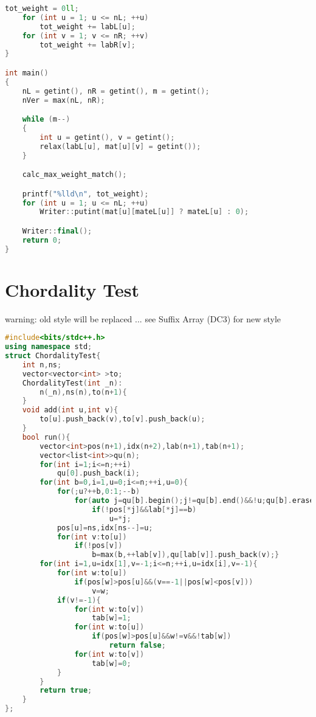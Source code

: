 \documentclass{book}
\begin{document}
\begin{lstlisting}[language=C++,title={Bipartite Graph Maximum Weighted Matching.hpp (4522 bytes, 259 lines)}]
	tot_weight = 0ll;
	for (int u = 1; u <= nL; ++u)
		tot_weight += labL[u];
	for (int v = 1; v <= nR; ++v)
		tot_weight += labR[v];
}

int main()
{
	nL = getint(), nR = getint(), m = getint();
	nVer = max(nL, nR);

	while (m--)
	{
		int u = getint(), v = getint();
		relax(labL[u], mat[u][v] = getint());
	}

	calc_max_weight_match();

	printf("%lld\n", tot_weight);
	for (int u = 1; u <= nL; ++u)
		Writer::putint(mat[u][mateL[u]] ? mateL[u] : 0);

	Writer::final();
	return 0;
}\end{lstlisting}
\section{Chordality Test}
warning: old style will be replaced ... see Suffix Array (DC3) for new style\begin{lstlisting}[language=C++,title={Chordality Test.hpp (1343 bytes, 42 lines)}]
#include<bits/stdc++.h>
using namespace std;
struct ChordalityTest{
    int n,ns;
    vector<vector<int> >to;
    ChordalityTest(int _n):
        n(_n),ns(n),to(n+1){
    }
    void add(int u,int v){
        to[u].push_back(v),to[v].push_back(u);
    }
    bool run(){
        vector<int>pos(n+1),idx(n+2),lab(n+1),tab(n+1);
        vector<list<int>>qu(n);
        for(int i=1;i<=n;++i)
            qu[0].push_back(i);
        for(int b=0,i=1,u=0;i<=n;++i,u=0){
            for(;u?++b,0:1;--b)
                for(auto j=qu[b].begin();j!=qu[b].end()&&!u;qu[b].erase(j++))
                    if(!pos[*j]&&lab[*j]==b)
                        u=*j;
            pos[u]=ns,idx[ns--]=u;
            for(int v:to[u])
                if(!pos[v])
                    b=max(b,++lab[v]),qu[lab[v]].push_back(v);}
        for(int i=1,u=idx[1],v=-1;i<=n;++i,u=idx[i],v=-1){
            for(int w:to[u])
                if(pos[w]>pos[u]&&(v==-1||pos[w]<pos[v]))
                    v=w;
            if(v!=-1){
                for(int w:to[v])
                    tab[w]=1;
                for(int w:to[u])
                    if(pos[w]>pos[u]&&w!=v&&!tab[w])
                        return false;
                for(int w:to[v])
                    tab[w]=0;
            }
        }
        return true;
    }
};
\end{lstlisting}
\end{document}
